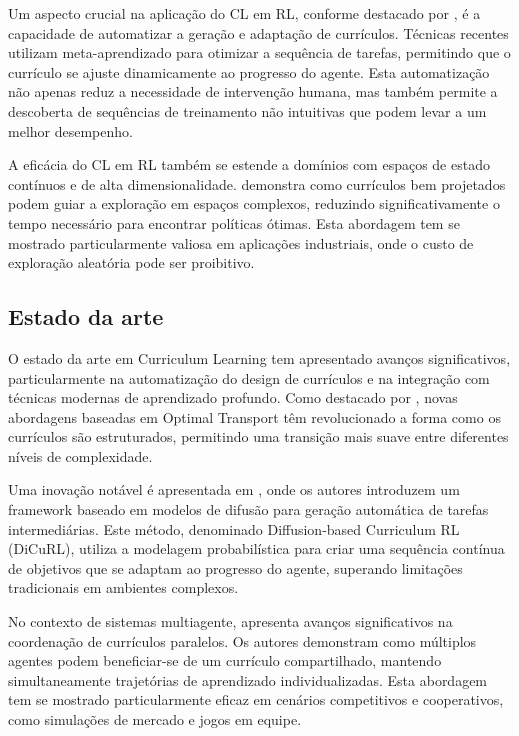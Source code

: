 Um aspecto crucial na aplicação do CL em RL, conforme destacado por \cite{https://arxiv.org/abs/2310.19424}, é a capacidade de automatizar a geração e adaptação de currículos. Técnicas recentes utilizam meta-aprendizado para otimizar a sequência de tarefas, permitindo que o currículo se ajuste dinamicamente ao progresso do agente. Esta automatização não apenas reduz a necessidade de intervenção humana, mas também permite a descoberta de sequências de treinamento não intuitivas que podem levar a um melhor desempenho.

A eficácia do CL em RL também se estende a domínios com espaços de estado contínuos e de alta dimensionalidade. \cite{https://dl.acm.org/doi/10.1145/3503161.3548549} demonstra como currículos bem projetados podem guiar a exploração em espaços complexos, reduzindo significativamente o tempo necessário para encontrar políticas ótimas. Esta abordagem tem se mostrado particularmente valiosa em aplicações industriais, onde o custo de exploração aleatória pode ser proibitivo.

\subsection{Estado da arte}
\label{subsec:curriculum_estado_arte}

O estado da arte em Curriculum Learning tem apresentado avanços significativos, particularmente na automatização do design de currículos e na integração com técnicas modernas de aprendizado profundo. Como destacado por \cite{https://proceedings.mlr.press/v162/klink22a/klink22a.pdf}, novas abordagens baseadas em Optimal Transport têm revolucionado a forma como os currículos são estruturados, permitindo uma transição mais suave entre diferentes níveis de complexidade.

Uma inovação notável é apresentada em \cite{https://openreview.net/forum?id=yRhrVaDOWE}, onde os autores introduzem um framework baseado em modelos de difusão para geração automática de tarefas intermediárias. Este método, denominado Diffusion-based Curriculum RL (DiCuRL), utiliza a modelagem probabilística para criar uma sequência contínua de objetivos que se adaptam ao progresso do agente, superando limitações tradicionais em ambientes complexos.

No contexto de sistemas multiagente, \cite{https://www.ijcai.org/proceedings/2017/757} apresenta avanços significativos na coordenação de currículos paralelos. Os autores demonstram como múltiplos agentes podem beneficiar-se de um currículo compartilhado, mantendo simultaneamente trajetórias de aprendizado individualizadas. Esta abordagem tem se mostrado particularmente eficaz em cenários competitivos e cooperativos, como simulações de mercado e jogos em equipe.

